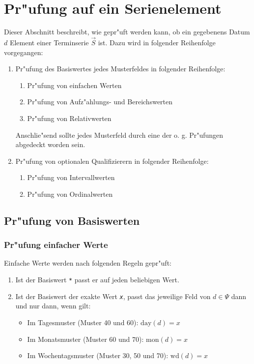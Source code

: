\documentclass[a4paper]{article}
\newcommand*{\dayf}{\mathrm{day}}
\newcommand*{\monf}{\mathrm{mon}}
\newcommand*{\wdf}{\mathrm{wd}}
\numberwithin{equation}{section}
\begin{document}
%
%
%
%
\section{Pr"ufung auf ein Serienelement}
\noindent Dieser Abschnitt beschreibt, wie gepr"uft werden kann, ob ein
gegebenens Datum $d$ Element einer Terminserie $\vec{S}$ ist. Dazu wird in
folgender Reihenfolge vorgegangen:
\begin{enumerate}
\item Pr"ufung des Basiswertes jedes Musterfeldes in folgender Reihenfolge:
  \begin{enumerate}
  \item Pr"ufung von einfachen Werten
  \item Pr"ufung von Aufz"ahlungs- und Bereichswerten
  \item Pr"ufung von Relativwerten
  \end{enumerate}
  Anschlie"send sollte jedes Musterfeld durch eine der o. g. Pr"ufungen
  abgedeckt worden sein.
\item Pr"ufung von optionalen Qualifizierern in folgender Reihenfolge:
  \begin{enumerate}
  \item Pr"ufung von Intervallwerten
  \item Pr"ufung von Ordinalwerten
  \end{enumerate}
\end{enumerate}


%
%
\subsection{Pr"ufung von Basiswerten}
\subsubsection{Pr"ufung einfacher Werte}
Einfache Werte werden nach folgenden Regeln gepr"uft:
\begin{enumerate}
  \item Ist der Basiswert \texttt{*} passt er auf jeden beliebigen Wert.
  \item Ist der Basiswert der exakte Wert \texttt{\textit{x}}, passt das
    jeweilige Feld von $d \in \Psi$ dann und nur dann, wenn gilt:
    \begin{itemize}
      \item Im Tagesmuster (Muster 40 und 60): $\dayf(d) = x$
      \item Im Monatsmuster (Muster 60 und 70): $\monf(d) = x$
      \item Im Wochentagsmuster (Muster 30, 50 und 70): $\wdf(d) = x$
    \end{itemize}
\end{enumerate}
\end{document}
